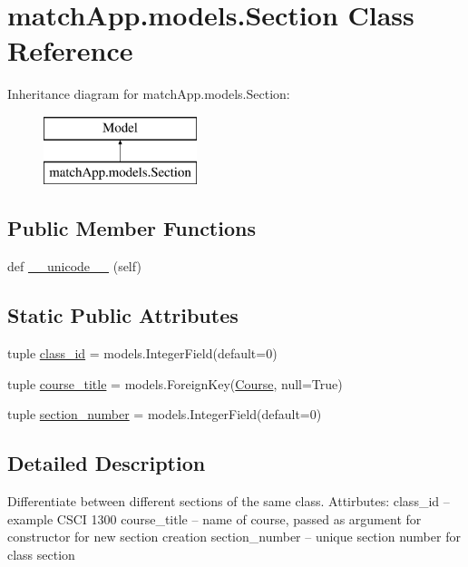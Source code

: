 \hypertarget{classmatch_app_1_1models_1_1_section}{}\section{match\+App.\+models.\+Section Class Reference}
\label{classmatch_app_1_1models_1_1_section}
Inheritance diagram for match\+App.\+models.\+Section\+:\begin{figure}[H]
\begin{center}
\leavevmode
\includegraphics[height=2.000000cm]{classmatch_app_1_1models_1_1_section}
\end{center}
\end{figure}
\subsection*{Public Member Functions}
\begin{DoxyCompactItemize}
\item 
def \hyperlink{classmatch_app_1_1models_1_1_section_a2a520eeadd2c5a65b9cee06f806eee3b}{\+\_\+\+\_\+unicode\+\_\+\+\_\+} (self)
\end{DoxyCompactItemize}
\subsection*{Static Public Attributes}
\begin{DoxyCompactItemize}
\item 
tuple \hyperlink{classmatch_app_1_1models_1_1_section_a53207e5dc7ac5210adeb7c4c638689c6}{class\+\_\+id} = models.\+Integer\+Field(default=0)
\item 
tuple \hyperlink{classmatch_app_1_1models_1_1_section_a39b73047a0a202fd7da8d54f45690820}{course\+\_\+title} = models.\+Foreign\+Key(\hyperlink{classmatch_app_1_1models_1_1_course}{Course}, null=True)
\item 
tuple \hyperlink{classmatch_app_1_1models_1_1_section_ae71939f61c0134b1bc0e02eab1b517d3}{section\+\_\+number} = models.\+Integer\+Field(default=0)
\end{DoxyCompactItemize}


\subsection{Detailed Description}
\begin{DoxyVerb}Differentiate between different sections of the same class. 
Attirbutes: 
class_id -- example CSCI 1300
course_title -- name of course, passed as argument for constructor for new section creation
section_number -- unique section number for class section
\end{DoxyVerb}
 

